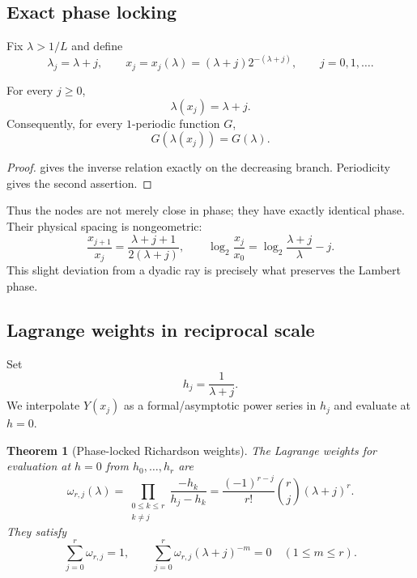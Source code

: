 \documentclass[11pt]{article}
\numberwithin{equation}{section}
\newtheorem{theorem}{Theorem}[section]
\theoremstyle{definition}
\theoremstyle{remark}
\begin{document}
\subsection{Exact phase locking}

Fix $\lambda>1/L$ and define
\begin{equation}
\lambda_j=\lambda+j,
\qquad
x_j=x_j(\lambda)=(\lambda+j)2^{-(\lambda+j)},
\qquad j=0,1,\ldots.
\label{p8:eq:phase-nodes}
\end{equation}

\begin{lemma}
\label{p8:lem:phase-lock}
For every $j\ge0$,
\begin{equation}
\lambda(x_j)=\lambda+j.
\label{p8:eq:phase-inverse}
\end{equation}
Consequently, for every $1$-periodic function $G$,
\begin{equation}
G(\lambda(x_j))=G(\lambda).
\label{p8:eq:periodic-lock}
\end{equation}
\end{lemma}

\begin{proof}
 gives the inverse relation exactly on the decreasing branch. Periodicity gives the second assertion.
\end{proof}

Thus the nodes are not merely close in phase; they have exactly identical phase. Their physical spacing is nongeometric:
\begin{equation}
\frac{x_{j+1}}{x_j}
=\frac{\lambda+j+1}{2(\lambda+j)},
\qquad
\log_2\frac{x_j}{x_0}
=\log_2\frac{\lambda+j}{\lambda}-j.
\label{p8:eq:x-spacing}
\end{equation}
This slight deviation from a dyadic ray is precisely what preserves the Lambert phase.

\subsection{Lagrange weights in reciprocal scale}

Set
\begin{equation}
h_j=\frac1{\lambda+j}.
\label{p8:eq:h-nodes}
\end{equation}
We interpolate $Y(x_j)$ as a formal/asymptotic power series in $h_j$ and evaluate at $h=0$.

\begin{theorem}[Phase-locked Richardson weights]
\label{p8:thm:lambert-weights}
The Lagrange weights for evaluation at $h=0$ from $h_0,\ldots,h_r$ are
\begin{equation}
\boxed{
\omega_{r,j}(\lambda)
=\prod_{\substack{0\le k\le r\\k\ne j}}
\frac{-h_k}{h_j-h_k}
=\frac{(-1)^{r-j}}{r!}\binom{r}{j}(\lambda+j)^r.}
\label{p8:eq:omega}
\end{equation}
They satisfy
\begin{equation}
\sum_{j=0}^{r}\omega_{r,j}=1,
\qquad
\sum_{j=0}^{r}\omega_{r,j}(\lambda+j)^{-m}=0
\quad(1\le m\le r).
\label{p8:eq:omega-cancel}
\end{equation}
\end{theorem}
\end{document}
